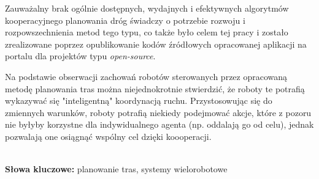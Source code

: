 \begin{singlespacing}
Zauważalny brak ogólnie dostępnych, wydajnych i efektywnych algorytmów kooperacyjnego planowania dróg świadczy o potrzebie rozwoju i rozpowszechnienia metod tego typu, co także było celem tej pracy i zostało zrealizowane poprzez opublikowanie kodów źródłowych opracowanej aplikacji na portalu dla projektów typu {\it open-source}.

Na podstawie obserwacji zachowań robotów sterowanych przez opracowaną metodę planowania tras można niejednokrotnie stwierdzić, że roboty te potrafią wykazywać się "inteligentną" koordynacją ruchu.
Przystosowując się do zmiennych warunków, roboty potrafią niekiedy podejmować akcje, które z pozoru nie byłyby korzystne dla indywidualnego agenta (np. oddalają go od celu), jednak pozwalają one osiągnąć wspólny cel dzięki koooperacji.

\flushbottom
\textbf{\\Słowa kluczowe: }planowanie tras, systemy wielorobotowe
\end{singlespacing}
